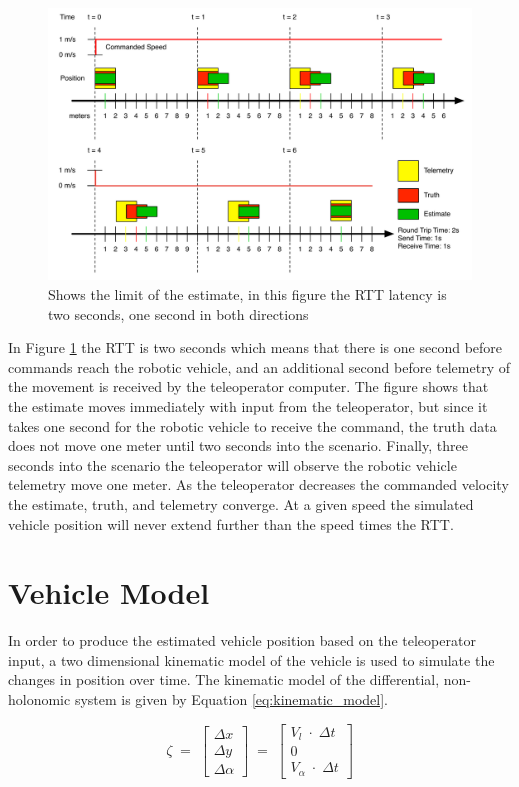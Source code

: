\documentclass[12pt]{report}
\begin{document}
\begin{figure}[ht]
  \centering
  \includegraphics[width=6.5in,keepaspectratio]{latency_reduction_timing.pdf}
  \caption{Shows the limit of the estimate, in this figure the RTT latency is two seconds, one second in both directions}
  \label{fig:latency_reduction_timing}
\end{figure}

In Figure \ref{fig:latency_reduction_timing} the RTT is two seconds which means that there is one second before commands reach the robotic vehicle, and an additional second before telemetry of the movement is received by the teleoperator computer.  The figure shows that the estimate moves immediately with input from the teleoperator, but since it takes one second for the robotic vehicle to receive the command, the truth data does not move one meter until two seconds into the scenario.  Finally, three seconds into the scenario the teleoperator will observe the robotic vehicle telemetry move one meter.  As the teleoperator decreases the commanded velocity the estimate, truth, and telemetry converge.  At a given speed the simulated vehicle position will never extend further than the speed times the RTT.

\section{Vehicle Model}
In order to produce the estimated vehicle position based on the teleoperator input, a two dimensional kinematic model of the vehicle is used to simulate the changes in position over time.  The kinematic model of the differential, non-holonomic system is given by Equation \ref{eq:kinematic_model}.

\begin{equation} \label{eq:kinematic_model}
\zeta \; =\; \left[ \begin{array}{c} \Delta x \\ \Delta y \\ \Delta \alpha \end{array} \right]\; =\; \left[ \begin{array}{c} V_{l}\; \cdot \; \Delta t \\ 0 \\ V_{\alpha }\; \cdot \; \Delta t \end{array} \right]
\end{equation}
\end{document}

